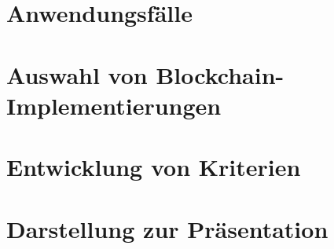 







 \newpage
\cleardoublepage 


\tableofcontents
\cleardoublepage 








\newpage

\chapter{Anwendungsfälle}\label{chap:usecases}



\chapter{Auswahl von Blockchain-Implementierungen}\label{chap:implementations}



\chapter{Entwicklung von Kriterien}


  
\chapter{Darstellung zur Präsentation}



